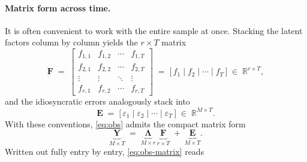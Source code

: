 \documentclass[11pt, a4paper, oneside]{article}
\newcommand{\mY}{\mathbf{Y}}
\newcommand{\mF}{\mathbf{F}}
\newcommand{\mL}{\boldsymbol{\Lambda}}
\newcommand{\mE}{\mathbf{E}}
\begin{document}
\paragraph{Matrix form across time.}
It is often convenient to work with the entire sample at once. Stacking
the latent factors column by column yields the $r \times T$ matrix
\[
\mF \;=\;
\begin{bmatrix}
    f_{1,1} & f_{1,2} & \cdots & f_{1,T} \\[2pt]
    f_{2,1} & f_{2,2} & \cdots & f_{2,T} \\[2pt]
    \vdots  & \vdots  & \ddots & \vdots  \\[2pt]
    f_{r,1} & f_{r,2} & \cdots & f_{r,T}
\end{bmatrix}
\;=\;
\big[\, f_1 \mid f_2 \mid \cdots \mid f_T \,\big]
\;\in\; \mathbb{R}^{r \times T},
\]
and the idiosyncratic errors analogously stack into
\[
\mE \;=\; \big[\, \varepsilon_1 \mid \varepsilon_2 \mid \cdots \mid \varepsilon_T \,\big]
\;\in\; \mathbb{R}^{M \times T}.
\]
With these conventions, \eqref{eq:obs} admits the compact matrix form
\begin{equation}
\underbrace{\mY}_{M \times T} \;=\; \underbrace{\mL}_{M \times r}\, \underbrace{\mF}_{r \times T} \;+\; \underbrace{\mE}_{M \times T}.
\label{eq:obs-matrix}
\end{equation}
Written out fully entry by entry, \eqref{eq:obs-matrix} reads
\end{document}
